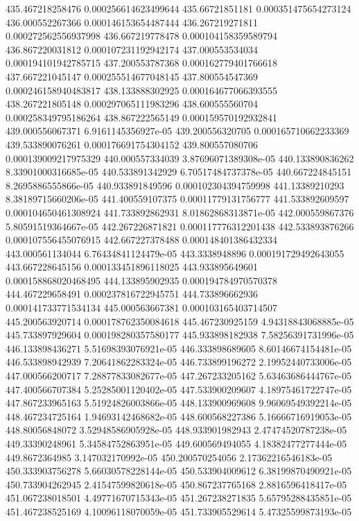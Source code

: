 {435.467218258476 0.000256614623499644
435.66721851181 0.000351475654273124
436.000552267366 0.000146153654487444
436.267219271811 0.000272562556937998
436.667219778478 0.000104158359589794
436.867220031812 0.000107231192942174
437.000553534034 0.000194101942785715
437.200553787368 0.000162779401766618
437.667221045147 0.000255514677048145
437.800554547369 0.000246158940483817
438.133888302925 0.000164677066393555
438.267221805148 0.000297065111983296
438.600555560704 0.000258349795186264
438.867222565149 0.000159570192932841
439.000556067371 6.9161145356927e-05
439.200556320705 0.000165710662233369
439.533890076261 0.000176691754304152
439.800557080706 0.000139009217975329
440.000557334039 3.87696071389308e-05
440.133890836262 8.33901000316685e-05
440.533891342929 6.70517484737378e-05
440.667224845151 8.2695886555866e-05
440.933891849596 0.000102304394759998
441.13389210293 8.38189715660206e-05
441.400559107375 0.00011779131756777
441.533892609597 0.000104650461308924
441.733892862931 8.01862868313871e-05
442.000559867376 5.80591519364667e-05
442.267226871821 0.000117776312201438
442.533893876266 0.000107556455076915
442.667227378488 0.000148401386432334
443.000561134044 6.76434841124479e-05
443.3338948896 0.000191729492643055
443.667228645156 0.000133451896118025
443.933895649601 0.000158868020468495
444.133895902935 0.000194784970570378
444.467229658491 0.000237816722945751
444.733896662936 0.000141733771534134
445.000563667381 0.000103165403714507
445.200563920714 0.000178762350084618
445.467230925159 4.94318843068885e-05
445.733897929604 0.000198280357580177
445.933898182938 7.58256391731996e-05
446.133898436271 5.51698393076921e-05
446.333898689605 8.60146674154481e-05
446.533898942939 7.20641862283324e-05
446.733899196272 2.19952440733006e-05
447.000566200717 7.28877833082677e-05
447.267233205162 5.63463686444767e-05
447.400566707384 5.25285001120402e-05
447.533900209607 4.18975461722747e-05
447.867233965163 5.51924826003866e-05
448.133900969608 9.96069549392214e-05
448.467234725164 1.94693142468682e-05
448.600568227386 5.16666716919053e-05
448.80056848072 3.52948586905928e-05
448.933901982943 2.47474520787238e-05
449.33390248961 5.34584752863951e-05
449.600569494055 4.18382477277444e-05
449.8672364985 3.147032170992e-05
450.200570254056 2.17362216546183e-05
450.333903756278 5.66030578228144e-05
450.533904009612 6.38199870490921e-05
450.733904262945 2.41547599820618e-05
450.867237765168 2.8816596418417e-05
451.067238018501 4.49771670715343e-05
451.267238271835 5.65795288435851e-05
451.467238525169 4.10096118070059e-05
451.733905529614 5.47325599873193e-05
}
